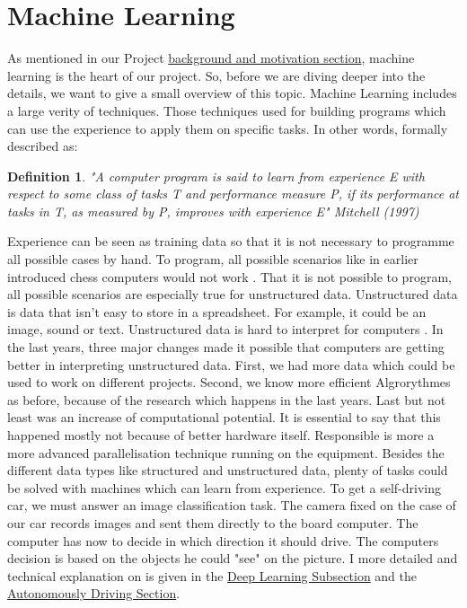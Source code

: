 \documentclass[journal]{IEEEtran}
\newtheorem{definition}{Definition}
\begin{document}
\section{Machine Learning}
As mentioned in our Project \hyperref[sec:backgroundMotivation]{background and motivation section}, machine learning is the heart of our project. So, before we are diving deeper into the details, we want to give a small overview of this topic. Machine Learning includes a large verity of techniques. Those techniques used for building programs which can use the experience to apply them on specific tasks. In other words, formally described as: \\
\begin{definition}
\noindent"A computer program is said to learn from experience E with respect to some class of tasks T and performance measure P, if its performance at tasks in T, as measured by P, improves with experience E"\- Mitchell (1997)  \\
\end{definition}
Experience can be seen as training data \cite{wang_2003} so that it is not necessary to programme all possible cases by hand. To program, all possible scenarios like in earlier introduced chess computers would not work \cite{Goodfellow-et-al-2016}. That it is not possible to program, all possible scenarios are especially true for unstructured data. Unstructured data is data that isn't easy to store in a spreadsheet. For example, it could be an image, sound or text. Unstructured data is hard to interpret for computers \cite{Goodfellow-et-al-2016}\cite{LeCun1998}. In the last years, three major changes made it possible that computers are getting better in interpreting unstructured data. First, we had more data which could be used to work on different projects. Second, we know more efficient Algrorythmes as before, because of the research which happens in the last years.
Last but not least was an increase of computational potential. It is essential to say that this happened mostly not because of better hardware itself. Responsible is more a more advanced parallelisation technique running on the equipment. Besides the different data types like structured and unstructured data, plenty of tasks could be solved with machines which can learn from experience. To get a self-driving car, we must answer an image classification task. The camera fixed on the case of our car records images and sent them directly to the board computer. The computer has now to decide in which direction it should drive. The computers decision is based on the objects he could "see" on the picture. I more detailed and technical explanation on is given in the \hyperref[subsec:deeplearning]{Deep Learning Subsection} and the \hyperref[sec:AutonomouslyDriving]{Autonomously Driving Section}.
\end{document}
